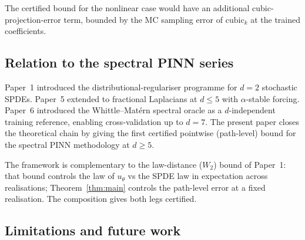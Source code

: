 The certified bound for the nonlinear case would have an additional
cubic-projection-error term, bounded by the MC sampling error of
$\mathrm{cubic}_k$ at the trained coefficients.

\subsection{Relation to the spectral PINN series}
\label{sec:disc:series}

Paper~1 \cite{paper1} introduced the distributional-regulariser
programme for $d = 2$ stochastic SPDEs. Paper~5 \cite{paper5} extended
to fractional Laplacians at $d \le 5$ with $\alpha$-stable forcing.
Paper~6 \cite{paper6} introduced the Whittle--Mat\'ern spectral oracle
as a $d$-independent training reference, enabling cross-validation up
to $d = 7$. The present paper closes the theoretical chain by giving
the first certified pointwise (path-level) bound for the spectral PINN
methodology at $d \ge 5$.

The framework is complementary to the law-distance ($W_2$) bound of
Paper~1: that bound controls the law of $u_\theta$ vs the SPDE law in
expectation across realisations; Theorem~\ref{thm:main} controls the
path-level error at a fixed realisation. The composition gives both
legs certified.

\subsection{Limitations and future work}
\label{sec:disc:limits}

